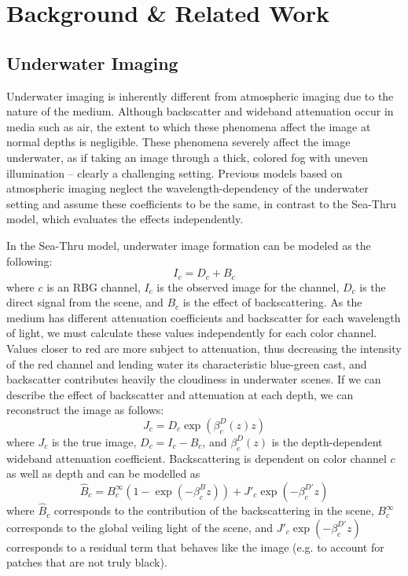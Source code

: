 \documentclass[10pt,twocolumn,letterpaper]{article}
\begin{document}
\section{Background \& Related Work}

\subsection{Underwater Imaging}
Underwater imaging is inherently different from atmospheric imaging due to the nature of the medium.
Although backscatter and wideband attenuation occur in media such as air, the extent to which
these phenomena affect the image at normal depths is negligible. These phenomena
severely affect the image underwater, as if taking an image through a thick, colored fog
with uneven illumination -- clearly a challenging setting. Previous models based on atmospheric imaging
neglect the wavelength-dependency of the underwater setting and assume these coefficients to be the same,
in contrast to the Sea-Thru model, which evaluates the effects independently.

In the Sea-Thru model, underwater image formation can be modeled as the following:
\begin{equation}
\label{eqn:imageformation}
I_c = D_c + B_c
\end{equation}
where $c$ is an RBG channel, $I_c$ is the observed image for the channel, $D_c$ is the direct signal from the scene,
and $B_c$ is the effect of backscattering. As the medium has different attenuation coefficients and backscatter for
each wavelength of light, we must calculate these values independently for each color channel. Values closer to red
are more subject to attenuation, thus decreasing the intensity of the red channel and lending water its characteristic
blue-green cast, and backscatter contributes heavily the cloudiness in underwater scenes. If we can describe the
effect of backscatter and attenuation at each depth, we can reconstruct the image as follows:
\begin{equation}
\label{eqn:scenereconstruction}
J_c = D_c \exp(\beta_c^D(z)z)
\end{equation}
where $J_c$ is the true image, $D_c = I_c - B_c$, and $\beta_c^D(z)$ is the depth-dependent wideband attenuation
coefficient.
Backscattering is dependent on color channel $c$ as well as depth and can be modelled as
\begin{equation}
\label{eqn:backscatter}
\hat{B}_c = B^\infty_c\left(1 - \exp(-\beta^B_c z)\right) + J'_c \exp(-\beta^{D'}_c z)
\end{equation}
where $\hat{B}_c$ corresponds to the contribution of the backscattering in the
scene, $B^\infty_c$ corresponds to the global veiling light of the scene, and
$J'_c \exp(-\beta^{D'}_c z)$ corresponds to a residual term that behaves like the
image (e.g. to account for patches that are not truly black).
\end{document}

